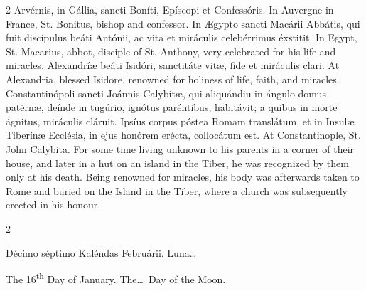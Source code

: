 \begin{paracol}{2}
\switchcolumn*
{}
Arvérnis, in Gállia, sancti Boníti, Epíscopi et Confessóris.
\switchcolumn
{}
In Auvergne in France, St. Bonitus, bishop and confessor.
\switchcolumn*
{}
In Ægypto sancti Macárii Abbátis, qui fuit 
 discípulus beáti Antónii, ac vita et miráculis celebérrimus éxstitit.
\switchcolumn
{}
In Egypt, St. Macarius, abbot, disciple of St. Anthony, very celebrated for 
 his life and miracles.
\switchcolumn*
{}
Alexandríæ beáti Isidóri, sanctitáte vitæ, fide 
 et miráculis clari.
\switchcolumn
{}
At Alexandria, blessed Isidore, renowned for holiness of life, faith, and 
 miracles.
\switchcolumn*
{}
Constantinópoli sancti Joánnis Calybítæ, qui 
 aliquándiu in ángulo domus patérnæ, deínde in tugúrio, ignótus paréntibus, 
 habitávit; a quibus in morte ágnitus, miráculis cláruit. Ipsíus corpus 
 póstea Romam translátum, et in Insulæ Tiberínæ Ecclésia, in ejus honórem 
 erécta, collocátum est.
\switchcolumn
{}
At Constantinople, St. John Calybita. For some time living unknown to 
 his parents in a corner of their house, and later in a hut on an island in 
 the Tiber, he was recognized by them only at his death. Being renowned 
 for miracles, his body was afterwards taken to Rome and buried on the Island 
 in the Tiber, where a church was subsequently erected in his honour.
\switchcolumn*
{}
\end{paracol}


\begin{paracol}{2}
\begin{center}{\color{gregoriocolor} Décimo séptimo Kaléndas Februárii. 
 Luna\dots\ }\end{center}
\switchcolumn
{}
\begin{center}{\color{gregoriocolor} The 16\textsuperscript{th} Day of 
 January. The\dots\ Day of the Moon.}\end{center}
\end{paracol}

